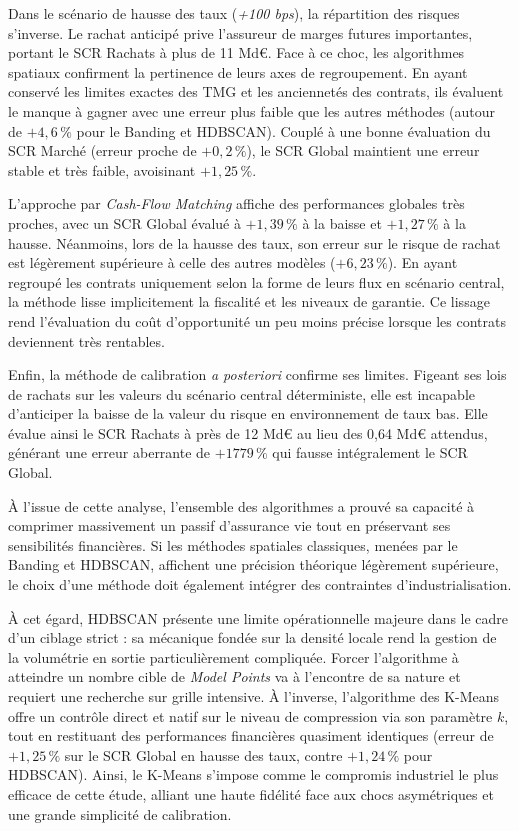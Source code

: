 Dans le scénario de hausse des taux (\textit{+100 bps}), la répartition des risques s'inverse. Le rachat anticipé prive l'assureur de marges futures importantes, portant le SCR Rachats à plus de 11 Md€. Face à ce choc, les algorithmes spatiaux confirment la pertinence de leurs axes de regroupement. En ayant conservé les limites exactes des TMG et les anciennetés des contrats, ils évaluent le manque à gagner avec une erreur plus faible que les autres méthodes (autour de $+4{,}6\,\%$ pour le Banding et HDBSCAN). Couplé à une bonne évaluation du SCR Marché (erreur proche de $+0{,}2\,\%$), le SCR Global maintient une erreur stable et très faible, avoisinant $+1{,}25\,\%$.

L'approche par \textit{Cash-Flow Matching} affiche des performances globales très proches, avec un SCR Global évalué à $+1{,}39\,\%$ à la baisse et $+1{,}27\,\%$ à la hausse. Néanmoins, lors de la hausse des taux, son erreur sur le risque de rachat est légèrement supérieure à celle des autres modèles ($+6{,}23\,\%$). En ayant regroupé les contrats uniquement selon la forme de leurs flux en scénario central, la méthode lisse implicitement la fiscalité et les niveaux de garantie. Ce lissage rend l'évaluation du coût d'opportunité un peu moins précise lorsque les contrats deviennent très rentables.

Enfin, la méthode de calibration \textit{a posteriori} confirme ses limites. Figeant ses lois de rachats sur les valeurs du scénario central déterministe, elle est incapable d'anticiper la baisse de la valeur du risque en environnement de taux bas. Elle évalue ainsi le SCR Rachats à près de 12 Md€ au lieu des 0,64 Md€ attendus, générant une erreur aberrante de $+1779\,\%$ qui fausse intégralement le SCR Global.

À l'issue de cette analyse, l'ensemble des algorithmes a prouvé sa capacité à comprimer massivement un passif d'assurance vie tout en préservant ses sensibilités financières. Si les méthodes spatiales classiques, menées par le Banding et HDBSCAN, affichent une précision théorique légèrement supérieure, le choix d'une méthode doit également intégrer des contraintes d'industrialisation. 

À cet égard, HDBSCAN présente une limite opérationnelle majeure dans le cadre d'un ciblage strict : sa mécanique fondée sur la densité locale rend la gestion de la volumétrie en sortie particulièrement compliquée. Forcer l'algorithme à atteindre un nombre cible de \textit{Model Points} va à l'encontre de sa nature et requiert une recherche sur grille intensive. À l'inverse, l'algorithme des K-Means offre un contrôle direct et natif sur le niveau de compression via son paramètre $k$, tout en restituant des performances financières quasiment identiques (erreur de $+1{,}25\,\%$ sur le SCR Global en hausse des taux, contre $+1{,}24\,\%$ pour HDBSCAN). Ainsi, le K-Means s'impose comme le compromis industriel le plus efficace de cette étude, alliant une haute fidélité face aux chocs asymétriques et une grande simplicité de calibration.

